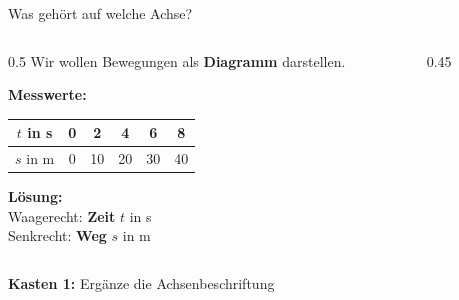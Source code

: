 \documentclass[aspectratio=169,11pt]{beamer}
\begin{document}
\begin{frame}{Was gehört auf welche Achse?}
    \begin{columns}
        \begin{column}{0.5\textwidth}
            Wir wollen Bewegungen als \textbf{Diagramm} darstellen.

            \vspace{0.8em}
            \textbf{Messwerte:}
            \begin{tabular}{|c|c|c|c|c|c|}
                \hline
                $t$ in s & 0 & 2 & 4 & 6 & 8 \\
                \hline
                $s$ in m & 0 & 10 & 20 & 30 & 40 \\
                \hline
            \end{tabular}

            \vspace{1em}
            \textcolor{loesung}{\textbf{Lösung:}\\
            Waagerecht: \textbf{Zeit} $t$ in s\\
            Senkrecht: \textbf{Weg} $s$ in m}
        \end{column}
        \begin{column}{0.45\textwidth}
        \end{column}
    \end{columns}

    \vspace{0.3em}
    \begin{abhinweis}
        \textbf{Kasten 1:} Ergänze die Achsenbeschriftung
    \end{abhinweis}
\end{frame}
\end{document}
